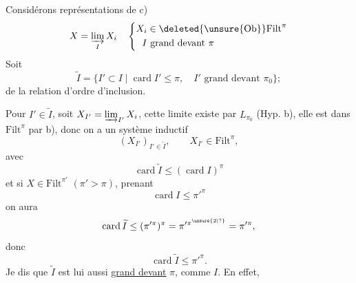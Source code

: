 Considérons  représentations de c)
\[
X=\varinjlim_I X_i\quad
\left\{\begin{aligned}
X_i&\in\deleted{\unsure{\mathrm{Ob}}}\mathrm{Filt}^{\pi}\\
I&\text{ grand devant }\pi
\end{aligned}\right.
\]
Soit
\[
\widetilde I=\{I'\subset I\mid\operatorname{card}I'\leq\pi,\quad I'\text{ grand devant }\pi_0\};
\]
 de la relation d'ordre d'inclusion.

Pour $I'\in\widetilde I$, soit $X_{I'}=\varinjlim_{I'}X_i$, cette limite existe par $L_{\pi_0}$ (Hyp. b), elle est dans $\mathrm{Filt}^{\pi}$ par b), donc on a un système inductif
\[
(X_{I'})_{I'\in\widetilde I},\qquad X_{I'}\in\mathrm{Filt}^{\pi},
\]
avec
\[
\operatorname{card}\widetilde I\leq(\operatorname{card}I)^{\pi}
\]
et si $X\in\mathrm{Filt}^{\pi'}$ $(\pi'>\pi)$,  prenant
\[
\operatorname{card}I\leq\pi'^{\pi}
\]
on aura
\[
\operatorname{card}\widetilde I\leq(\pi'^{\pi})^{\pi}=\pi'^{\pi^{\unsure{2|?}}}=\pi'^{\pi},
\]
donc
\[
\operatorname{card}\widetilde I\leq\pi'^{\pi}.
\]
Je dis que $\widetilde I$ est lui aussi \uline{grand devant} $\pi$,  comme $I$. En effet,
